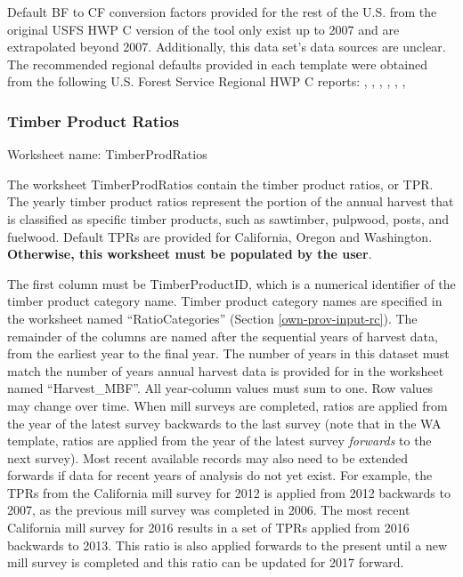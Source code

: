 \documentclass[
  openany]{book}
\begin{document}
Default BF to CF conversion factors provided for the rest of the U.S. from the original USFS HWP C version of the tool only exist up to 2007 and are extrapolated beyond 2007. Additionally, this data set's data sources are unclear. The recommended regional defaults provided in each template were obtained from the following U.S. Forest Service Regional HWP C reports: \textcite{butler2014nw}, \textcite{butler2014sw}, \textcite{loeffler2014er}, \textcite{loeffler2014sr}, \textcite{stockmann2014nr}, \textcite{stockmann2014imr}, \textcite{stockmann2014rmr}

\hypertarget{own-prov-input-tpr}{%
\subsubsection{Timber Product Ratios}\label{own-prov-input-tpr}}

Worksheet name: TimberProdRatios

The worksheet TimberProdRatios contain the timber product ratios, or TPR. The yearly timber product ratios represent the portion of the annual harvest that is classified as specific timber products, such as sawtimber, pulpwood, posts, and fuelwood. Default TPRs are provided for California, Oregon and Washington. \textbf{Otherwise, this worksheet must be populated by the user}.

The first column must be TimberProductID, which is a numerical identifier of the timber product category name. Timber product category names are specified in the worksheet named ``RatioCategories'' (Section \ref{own-prov-input-rc}). The remainder of the columns are named after the sequential years of harvest data, from the earliest year to the final year. The number of years in this dataset must match the number of years annual harvest data is provided for in the worksheet named ``Harvest\_MBF''. All year-column values must sum to one. Row values may change over time. When mill surveys are completed, ratios are applied from the year of the latest survey backwards to the last survey (note that in the WA template, ratios are applied from the year of the latest survey \emph{forwards} to the next survey). Most recent available records may also need to be extended forwards if data for recent years of analysis do not yet exist. For example, the TPRs from the California mill survey for 2012 is applied from 2012 backwards to 2007, as the previous mill survey was completed in 2006. The most recent California mill survey for 2016 results in a set of TPRs applied from 2016 backwards to 2013. This ratio is also applied forwards to the present until a new mill survey is completed and this ratio can be updated for 2017 forward.
\end{document}
